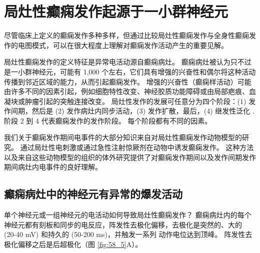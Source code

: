 \section{局灶性癫痫发作起源于一小群神经元}

尽管临床上定义的癫痫发作多种多样，但通过比较局灶性癫痫发作与全身性癫痫发作的电图模式，可以在很大程度上理解对癫痫发作活动产生的重要见解。


局灶性癫痫发作的定义特征是异常电活动源自癫痫病灶。
癫痫病灶被认为只不过是一小群神经元，可能有 1,000 个左右，它们具有增强的兴奋性和偶尔将这种活动传播到邻近区域的能力，从而引起癫痫发作。
增强的兴奋性（癫痫样活动）可能由许多不同的因素引起，例如细胞特性改变、神经胶质功能障碍或由局部疤痕、血凝块或肿瘤引起的突触连接改变。
局灶性发作的发展可任意分为四个阶段：(1) 发作间期，然后是 (2) 发作病灶内同步活动，(3) 发作扩散，最后，(4) 继发性泛化 . 阶段 2 到 4 代表癫痫发作的发作阶段。
每个阶段都有不同的因素。


我们关于癫痫发作期间电事件的大部分知识来自对局灶性癫痫发作动物模型的研究。
通过局灶性电刺激或通过急性注射惊厥剂在动物中诱发癫痫发作。
这种方法以及来自这些动物模型的组织的体外研究提供了对癫痫发作期间以及发作间期发作期间病灶内电事件的良好理解。



\subsection{癫痫病灶中的神经元有异常的爆发活动}

单个神经元或一组神经元的电活动如何导致局灶性癫痫发作？
癫痫病灶内的每个神经元都有刻板和同步的电反应，阵发性去极化偏移，去极化是突然的、大的 (20-40 mV) 和持久的 (50-200 ms)，并触发一系列 动作电位达到顶峰。
阵发性去极化偏移之后是后超极化（图 \ref{fig:58_5}A）。


